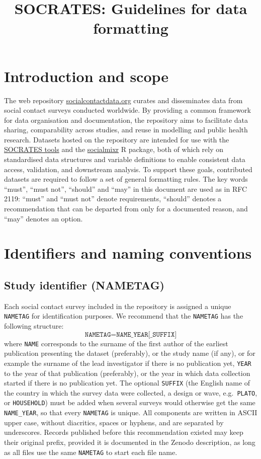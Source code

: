 \documentclass[11pt,a4paper]{article}
\title{\textbf{SOCRATES: Guidelines for data formatting}}
\date{}
\begin{document}
\maketitle \vspace{-1.2cm}

\section{Introduction and scope}
\noindent
The web repository \href{https://socialcontactdata.org}{socialcontactdata.org} curates and disseminates data from social contact surveys conducted worldwide.
By providing a common framework for data organisation and documentation, the repository aims to facilitate data sharing, comparability across studies, and reuse in modelling and public health research. Datasets hosted on the repository are intended for use with the \href{https://lwillem.shinyapps.io/socrates_rshiny/}{SOCRATES tools} and the \href{https://cran.r-project.org/web/packages/socialmixr/index.html}{socialmixr} R package, both of which rely on standardised data structures and variable definitions to enable consistent data access, validation, and downstream analysis. To support these goals, contributed datasets are required to follow a set of general formatting rules.
The key words ``must'', ``must not'', ``should'' and ``may'' in this document are used as in RFC 2119: ``must'' and ``must not'' denote requirements, ``should'' denotes a recommendation that can be departed from only for a documented reason, and ``may'' denotes an option.

\section{Identifiers and naming conventions}
\subsection{Study identifier (NAMETAG)}
\label{sec:nametag}
Each social contact survey included in the repository is assigned a unique \texttt{NAMETAG} for identification purposes. We recommend that the \texttt{NAMETAG} has the following structure:
\[
\texttt{NAMETAG} = \texttt{NAME\_YEAR[\_SUFFIX]}
\]
where \texttt{NAME} corresponds to the surname of the first author of the earliest publication presenting the dataset (preferably), or the study name (if any), or for example the surname of the lead investigator if there is no publication yet, \texttt{YEAR} to the year of that publication (preferably), or the year in which data collection started if there is no publication yet. The optional \texttt{SUFFIX} (the English name of the country in which the survey data were collected, a design or wave, e.g.\ \texttt{PLATO}, or \texttt{HOUSEHOLD}) must be added when several surveys would otherwise get the same \texttt{NAME\_YEAR}, so that every \texttt{NAMETAG} is unique. All components are written in ASCII upper case, without diacritics, spaces or hyphens, and are separated by underscores. Records published before this recommendation existed may keep their original prefix, provided it is documented in the Zenodo description, as long as all files use the same \texttt{NAMETAG} to start each file name.
\end{document}
